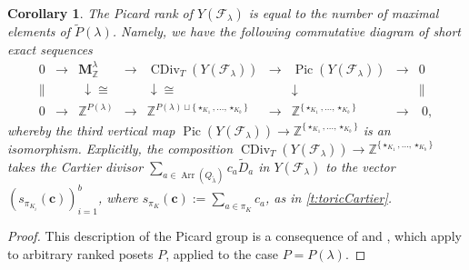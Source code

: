 \documentclass{amsart}
\newtheorem{cor}[thm]{Corollary}
\theoremstyle{definition}
\numberwithin{equation}{section}
\newcommand{\Pic}{\operatorname{Pic}}
\newcommand{\Arr}{\operatorname{Arr}}
\newcommand{\FF}{\mathcal{F}}
\newcommand{\Z}{\mathbb{Z}}
\begin{document}
\begin{cor}\label{c:toricPicard}  The Picard rank of $Y(\FF_\lambda)$ is equal to the number of maximal elements of $\widetilde P(\lambda)$. Namely, we have the following commutative diagram  of  short exact sequences
\[
\begin{array}{ccccccccc}
0&\longrightarrow &\mathbf M_\Z^\lambda&\longrightarrow &\operatorname{CDiv}_T(Y(\FF_\lambda))
&\longrightarrow &
\Pic(Y(\FF_\lambda))&\longrightarrow &0\\
\|&&\ \downarrow\cong &&\downarrow\cong &&\downarrow &&\|\\
0&\longrightarrow &\Z^{P(\lambda)}&\longrightarrow &\Z^{P(\lambda)\sqcup\{\star_{K_1},\dotsc,\star_{K_b} \}}&\longrightarrow &
\Z^{\{\star_{K_1},\dotsc,\star_{K_b} \}}&\longrightarrow &\ 0,
\end{array}
\] 
whereby the third vertical map $\Pic(Y(\FF_{\lambda})) \to\Z^{\{\star_{K_1},\dotsc,\star_{K_b}\}}$ is an isomorphism.	
Explicitly, the composition $\operatorname{CDiv}_T(Y(\FF_\lambda))\to  \Z^{\{\star_{K_1},\dotsc,\star_{K_b} \}}$ takes the Cartier divisor $\sum_{a\in \Arr(Q_{\widetilde{\lambda}})} c_a \widetilde D_a$ in $Y(\FF_\lambda)$ to the vector $(s_{\pi_{K_i}}(\mathbf c))_{i=1}^b$,
 where $s_{\pi_K}(\mathbf c):=\sum_{a\in\pi_K} c_a$, as in \cref{t:toricCartier}.
\end{cor}
\begin{proof}
This description of the Picard group is a consequence of \cite[Theorem~5.18]{RWReflexive} and \cite[Remark~5.19]{RWReflexive}, which apply to arbitrary ranked posets $P$, applied to the case $P=P(\lambda)$. 
\end{proof}
\end{document}
